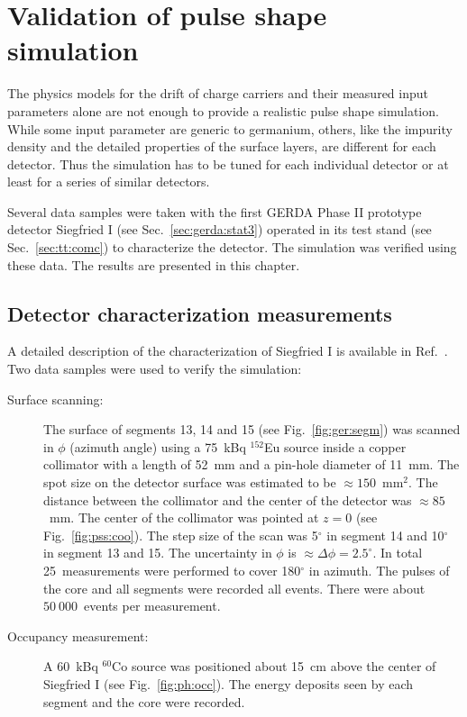 \chapter{Validation of pulse shape simulation}
\label{cha:psa}
The physics models \cite{miha, bart} for the drift of charge carriers and their measured input parameters \cite{miha, bart} alone are not enough to provide a realistic pulse shape simulation. While some input parameter are generic to germanium, others, like the impurity density and the detailed properties of the surface layers, are different for each detector. Thus the simulation has to be tuned for each individual detector or at least for a series of similar detectors. 

Several data samples were taken with the first GERDA Phase II prototype detector Siegfried I (see Sec.~\ref{sec:gerda:stat3}) operated in its test stand (see Sec.~\ref{sec:tt:comc}) to characterize the detector. The simulation  was verified using these data. The results are presented in this chapter.

\section{Detector characterization measurements}
\label{sec:psa:char}
A detailed description of the characterization of Siegfried I is available in Ref.~\cite{Sie07}. Two data samples were used to verify the simulation:
\begin{description}
\item[Surface scanning:] The surface of segments 13, 14 and 15 (see Fig.~\ref{fig:ger:segm}) was scanned in $\phi$ (azimuth angle) using a 75~kBq $^{152}$Eu source inside a copper collimator with a length of 52~mm and a pin-hole diameter of 11~mm. The spot size on the detector surface was estimated to be $\approx 150$~mm$^{2}$. The distance between the collimator and the center of the detector was $\approx 85$~mm. The center of the collimator was pointed at $z = 0$ (see Fig.~\ref{fig:pss:coo}). 
The step size of the scan was  5$^{\circ}$ in segment 14 and 10$^{\circ}$ in segment 13 and 15. The uncertainty in $\phi$ is $\approx \Delta \phi=2.5^{\circ}$. In total 25~measurements were performed to cover 180$^{\circ}$ in azimuth. The pulses of the core and all segments were recorded all events. There were about $50\ 000$~events per measurement.
\item[Occupancy measurement:] A 60~kBq $^{60}$Co source was positioned about 15~cm above the center of Siegfried I (see Fig.~\ref{fig:ph:occ}). The energy deposits seen by each segment and the core were recorded.
\end{description}

